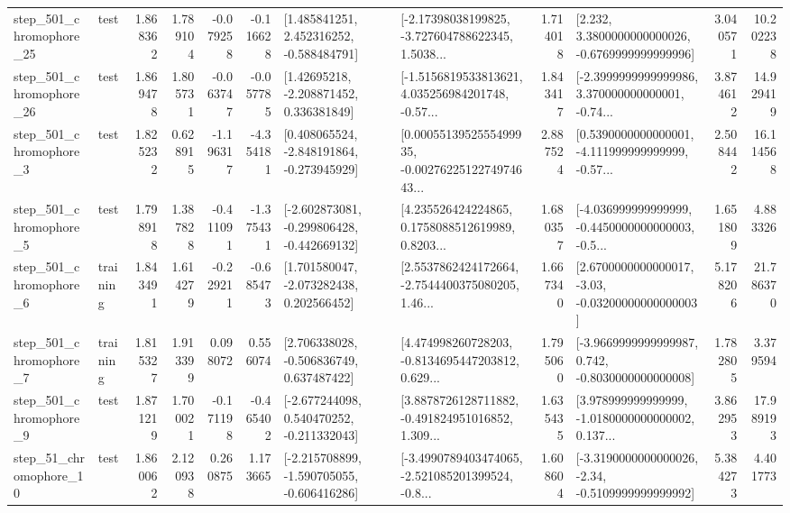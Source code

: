 \begin{tabular}{llrrrrllrlrr}
  step\_501\_chromophore\_25 &      test &      1.868362 &    1.789104 &     -0.079258 & -0.116628 &    [1.485841251, 2.452316252, -0.588484791] &  [-2.17398038199825, -3.727604788622345, 1.5038... &       1.714018 &   [2.232, 3.3800000000000026, -0.6769999999999996] &            3.040571 &         10.202238 \\
  step\_501\_chromophore\_26 &      test &      1.869478 &    1.805731 &     -0.063747 & -0.057785 &     [1.42695218, -2.208871452, 0.336381849] &  [-1.5156819533813621, 4.035256984201748, -0.57... &       1.843417 &  [-2.3999999999999986, 3.370000000000001, -0.74... &            3.874612 &         14.929419 \\
   step\_501\_chromophore\_3 &      test &      1.825232 &    0.628915 &     -1.196317 & -4.354181 &   [0.408065524, -2.848191864, -0.273945929] &  [0.0005513952555499935, -0.0027622512274974643... &       2.887524 &  [0.5390000000000001, -4.111999999999999, -0.57... &            2.508442 &         16.114568 \\
   step\_501\_chromophore\_5 &      test &      1.798918 &    1.387828 &     -0.411091 & -1.375431 &  [-2.602873081, -0.299806428, -0.442669132] &  [4.235526424224865, 0.1758088512619989, 0.8203... &       1.680357 &  [-4.036999999999999, -0.4450000000000003, -0.5... &            1.651809 &          4.883326 \\
   step\_501\_chromophore\_6 &  training &      1.843491 &    1.614279 &     -0.229211 & -0.685473 &    [1.701580047, -2.073282438, 0.202566452] &  [2.5537862424172664, -2.7544400375080205, 1.46... &       1.667340 &  [2.6700000000000017, -3.03, -0.03200000000000003] &            5.178206 &         21.786370 \\
   step\_501\_chromophore\_7 &  training &      1.815327 &    1.913399 &      0.098072 &  0.556074 &    [2.706338028, -0.506836749, 0.637487422] &  [4.474998260728203, -0.8134695447203812, 0.629... &       1.795060 &  [-3.9669999999999987, 0.742, -0.8030000000000008] &            1.782805 &          3.379594 \\
   step\_501\_chromophore\_9 &      test &      1.871219 &    1.700021 &     -0.171198 & -0.465402 &   [-2.677244098, 0.540470252, -0.211332043] &  [3.8878726128711882, -0.491824951016852, 1.309... &       1.635435 &  [3.978999999999999, -1.0180000000000002, 0.137... &            3.862953 &         17.989193 \\
   step\_51\_chromophore\_10 &      test &      1.860062 &    2.120938 &      0.260875 &  1.173665 &  [-2.215708899, -1.590705055, -0.606416286] &  [-3.4990789403474065, -2.521085201399524, -0.8... &       1.608604 &  [-3.3190000000000026, -2.34, -0.5109999999999992] &            5.384273 &          4.401773 \\

\end{tabular}

